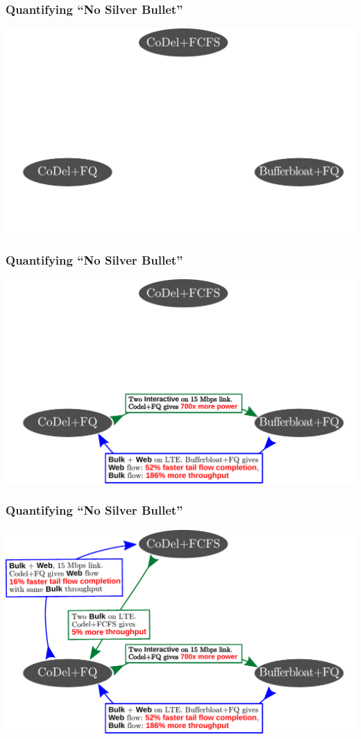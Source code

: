 \begin{frame}[plain]
\frametitle{Quantifying ``No Silver Bullet''}
\begin{center}
\includegraphics[width=\columnwidth]{fig-3.pdf}
\end{center}
\end{frame}

\begin{frame}[plain]
\frametitle{Quantifying ``No Silver Bullet''}
\begin{center}
\includegraphics[width=\columnwidth]{fig-2.pdf}
\end{center}
\end{frame}

\begin{frame}[plain]
\frametitle{Quantifying ``No Silver Bullet''}
\begin{center}
\includegraphics[width=\columnwidth]{fig-1.pdf}
\end{center}
\end{frame}


